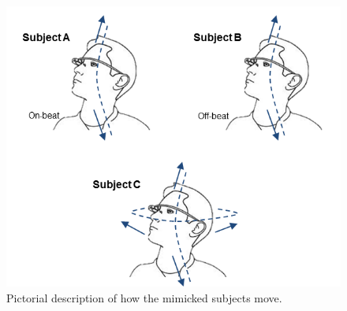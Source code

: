 \begin{figure}
\centering
\includegraphics[width = \columnwidth]{figure/imitation_subject_movement.png}
\caption{\label{fig:imitation_movement} Pictorial description of how the mimicked subjects move.}
\end{figure}

 